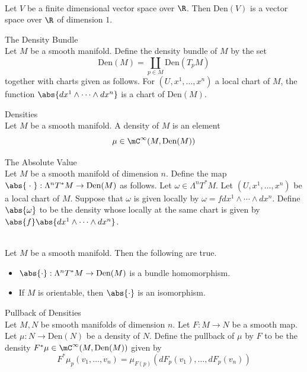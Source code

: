 \documentclass[a4paper]{article}
\begin{document}
\begin{lmm}{}{}\\
Let $V$ be a finite dimensional vector space over $\R$. Then $\text{Den}(V)$ is a vector space over $\R$ of dimension $1$. 
\end{lmm}

\begin{defn}{The Density Bundle}{}\\
Let $M$ be a smooth manifold. Define the density bundle of $M$ by the set $$\text{Den}(M)=\coprod_{p\in M}\text{Den}(T_pM)$$ together with charts given as follows. For $(U,x^1,\dots,x^n)$ a local chart of $M$, the function $\abs{dx^1\wedge\cdots\wedge dx^n}$ is a chart of $\text{Den}(M)$. 
\end{defn}

\begin{defn}{Densities}{}\\
Let $M$ be a smooth manifold. A density of $M$ is an element $$\mu\in\mC^\infty(M,\text{Den}(M))$$
\end{defn}

\begin{defn}{The Absolute Value}{}\\
Let $M$ be a smooth manifold of dimension $n$. Define the map $\abs{\;\cdot\;}:\Lambda^nT^\ast M\to\text{Den}(M)$ as follows. Let $\omega\in\Lambda^nT^\ast M$. Let $(U,x^1,\dots,x^n)$ be a local chart of $M$. Suppose that $\omega$ is given locally by $\omega=fdx^1\wedge\cdots\wedge dx^n$. Define $\abs{\omega}$ to be the density whose locally at the same chart is given by $\abs{f}\abs{dx^1\wedge\cdots\wedge dx^n}$. 
\end{defn}

\begin{prp}{}{}\\
Let $M$ be a smooth manifold. Then the following are true. 
\begin{itemize}
\item $\abs{\cdot}:\Lambda^nT^\ast M\to\text{Den}(M)$ is a bundle homomorphism. 
\item If $M$ is orientable, then $\abs{\cdot}$ is an isomorphism. 
\end{itemize}
\end{prp}

\begin{defn}{Pullback of Densities}{}\\
Let $M,N$ be smooth manifolds of dimension $n$. Let $F:M\to N$ be a smooth map. Let $\mu:N\to\text{Den}(N)$ be a density of $N$. Define the pullback of $\mu$ by $F$ to be the density $F^\ast\mu\in\mC^\infty(M,\text{Den}(M))$ given by $$F^\ast\mu_p(v_1,\dots,v_n)=\mu_{F(p)}(dF_p(v_1),\dots,dF_p(v_n))$$
\end{defn}
\end{document}
